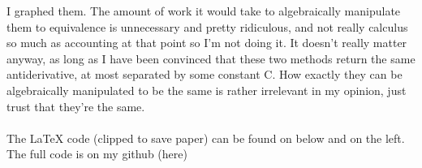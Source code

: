 \documentclass[twocolumn]{article}
\begin{document}
   I graphed them. The amount of work it would take to algebraically manipulate them to equivalence is unnecessary and pretty ridiculous, and not really calculus so much as accounting at that point so I'm not doing it. It doesn't really matter anyway, as long as I have been convinced that these two methods return the same antiderivative, at most separated by some constant C. How exactly they can be algebraically manipulated to be the same is rather irrelevant in my opinion, just trust that they're the same. \\\\ The LaTeX code (clipped to save paper) can be found on below and on the left. The full code is on my github (here)
  
\end{document}
